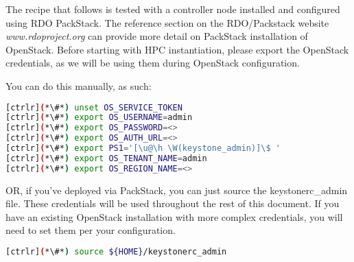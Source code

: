 	The recipe that follows is tested with a controller node installed and configured using RDO PackStack.
	The reference section on the RDO/Packstack website {\em www.rdoproject.org }can provide more detail on PackStack installation of OpenStack.
	Before starting with HPC instantiation, please export the OpenStack credentials, as we will be using them during OpenStack configuration. 

	You can do this manually, as such:

\begin{lstlisting}[language=bash,keywords={}]
[ctrlr](*\#*) unset OS_SERVICE_TOKEN
[ctrlr](*\#*) export OS_USERNAME=admin
[ctrlr](*\#*) export OS_PASSWORD=<>
[ctrlr](*\#*) export OS_AUTH_URL=<>
[ctrlr](*\#*) export PS1='[\u@\h \W(keystone_admin)]\$ '
[ctrlr](*\#*) export OS_TENANT_NAME=admin
[ctrlr](*\#*) export OS_REGION_NAME=<>  
\end{lstlisting}

	OR, if you've deployed via PackStack, you can just source the keystonerc\_admin file. These credentials will be used throughout the rest of this document. If you have an existing OpenStack installation with more complex credentials, you will need to set them per your configuration.

\begin{lstlisting}[language=bash,keywords={}]
[ctrlr](*\#*) source ${HOME}/keystonerc_admin
\end{lstlisting}
